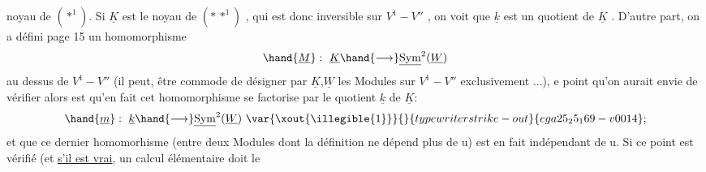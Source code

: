 noyau de $(*^1)$. Si $\underline{K}$ est le noyau de $(*\,*^1)$ , qui est donc inversible sur
$V^1-V''$ , on voit  que $\underline{k}$ est un quotient de $\underline{K}$ . D'autre part, on a défini
page 15 un homomorphisme
\[ \hand{\underline{M}} : \ \underline{K}\hand{\longrightarrow}\underline{\mathrm{Sym}}^2(\underline{W}) \]
au dessus de $V^1-V''$ (il peut, être commode de désigner par $\underline{K}$,$\underline{W}$ les Modules
sur $V^1-V''$ exclusivement ...),  e point qu'on aurait envie de vérifier
alors est qu'en fait cet homomorphisme se factorise par le quotient $\underline{k}$ de $\underline{K}$:
\[ \hand{\underline{m}} : \ \underline{k}\hand{\longrightarrow}\underline{\mathrm{Sym}}^2(\underline{W}) \ \var{\xout{\illegible{1}}}{}{typewriter strike-out}{ega25_25_169-v0014} ; \]
et que ce dernier homomorhisme (entre deux Modules dont la définition ne
 dépend plus de u) est en fait indépendant de
u. Si ce point est vérifié (et \uline{s'il est vrai}, un calcul élémentaire doit le

